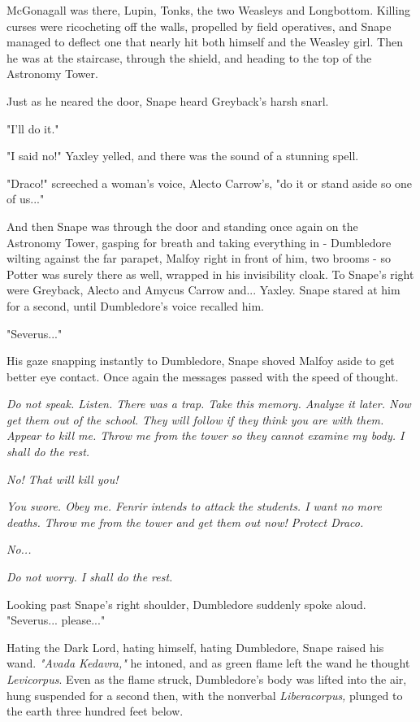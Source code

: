 McGonagall was there, Lupin, Tonks, the two Weasleys and Longbottom. Killing curses were ricocheting off the walls, propelled by field operatives, and Snape managed to deflect one that nearly hit both himself and the Weasley girl. Then he was at the staircase, through the shield, and heading to the top of the Astronomy Tower.

Just as he neared the door, Snape heard Greyback's harsh snarl.

"I'll do it."

"I said no!" Yaxley yelled, and there was the sound of a stunning spell.

"Draco!" screeched a woman's voice, Alecto Carrow's, "do it or stand aside so one of us..."

And then Snape was through the door and standing once again on the Astronomy Tower, gasping for breath and taking everything in - Dumbledore wilting against the far parapet, Malfoy right in front of him, two brooms - so Potter was surely there as well, wrapped in his invisibility cloak. To Snape's right were Greyback, Alecto and Amycus Carrow and... Yaxley. Snape stared at him for a second, until Dumbledore's voice recalled him.

"Severus..."

His gaze snapping instantly to Dumbledore, Snape shoved Malfoy aside to get better eye contact. Once again the messages passed with the speed of thought.

\emph{Do not speak. Listen. There was a trap. Take this memory. Analyze it later. Now get them out of the school. They will follow if they think you are with them. Appear to kill me. Throw me from the tower so they cannot examine my body. I shall do the rest.}

\emph{No! That will kill you!}

\emph{You swore. Obey me. Fenrir intends to attack the students. I want no more deaths. Throw me from the tower and get them out now! Protect Draco.}

\emph{No...}

\emph{Do not worry. I shall do the rest.}

Looking past Snape's right shoulder, Dumbledore suddenly spoke aloud. "Severus... please..."

Hating the Dark Lord, hating himself, hating Dumbledore, Snape raised his wand. \emph{"Avada Kedavra,"} he intoned, and as green flame left the wand he thought \emph{Levicorpus}. Even as the flame struck, Dumbledore's body was lifted into the air, hung suspended for a second then, with the nonverbal \emph{Liberacorpus,} plunged to the earth three hundred feet below.

